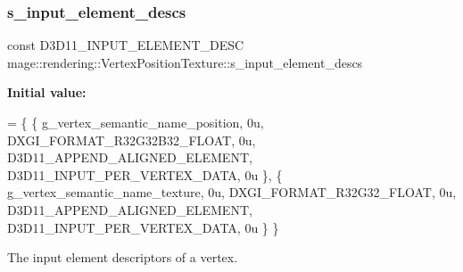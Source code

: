 \subsubsection{\texorpdfstring{s\+\_\+input\+\_\+element\+\_\+descs}{s\_input\_element\_descs}}
{\footnotesize\ttfamily const D3\+D11\+\_\+\+I\+N\+P\+U\+T\+\_\+\+E\+L\+E\+M\+E\+N\+T\+\_\+\+D\+E\+SC mage\+::rendering\+::\+Vertex\+Position\+Texture\+::s\+\_\+input\+\_\+element\+\_\+descs\hspace{0.3cm}{\ttfamily [static]}}

{\bfseries Initial value\+:}
\begin{DoxyCode}
= \{
        \{ g\_vertex\_semantic\_name\_position, 0u, DXGI\_FORMAT\_R32G32B32\_FLOAT,    0u, 
      D3D11\_APPEND\_ALIGNED\_ELEMENT, D3D11\_INPUT\_PER\_VERTEX\_DATA, 0u \},
        \{ g\_vertex\_semantic\_name\_texture,  0u, DXGI\_FORMAT\_R32G32\_FLOAT,       0u, 
      D3D11\_APPEND\_ALIGNED\_ELEMENT, D3D11\_INPUT\_PER\_VERTEX\_DATA, 0u \}
    \}
\end{DoxyCode}
The input element descriptors of a vertex. 